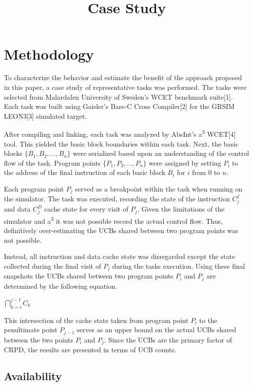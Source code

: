 \documentclass[12pt]{article}
\title{Case Study}
\begin{document}
\section{Methodology}

To characterize the behavior and estimate the benefit of the approach
proposed in this paper, a case study of representative tasks was
performed. The tasks were selected from Malardalen University of
Sweden's WCET benchmark suite[1]. Each task was built using Gaisler's
Bare-C Cross Compiler[2] for the GRSIM LEON3[3] simulated target. 

After compiling and linking, each task was analyzed by AbsInt's
a\textsuperscript{3} WCET[4] tool. This yielded the basic block
boundaries within each task. Next, the basic blocks
${\{B_1, B_2, ..., B_n\}}$ were serialized based upon an understanding of
the control flow of the task. Program points
${\{P_1, P_2, ..., P_n\}}$ were assigned by setting ${P_i}$ to the
address of the final instruction of each basic block ${B_i}$ for ${i}$
from ${0}$ to ${n}$.

Each program point ${P_j}$ served as a breakpoint within the task when
running on the simulator. The task was executed, recording the state of
the instruction ${C^I_j}$ and data ${C^D_j}$ cache state for every
visit of ${P_j}$. Given the limitations of the simulator and
a\textsuperscript{3} it was not possible record the actual control
flow. Thus, definitively over-estimating the UCBs shared between two
program points was not possible.

Instead, all instruction and data cache state was disregarded except
the state collected during the final visit of ${P_j}$ during the tasks
execution. Using these final snapshots the UCBs shared between two
program points ${P_i}$ and ${P_j}$ are determined by the following
equation.

\begin{center}
  ${\bigcap_{k=i}^{j-1} C_k}$
\end{center}

This intersection of the cache state taken from program point ${P_i}$
to the penultimate point ${P_{j-1}}$ serves as an upper bound on the
actual UCBs shared between the two points ${P_i}$ and ${P_j}$. Since
the UCBs are the primary factor of CRPD, the results are presented in
terms of UCB counts.

\subsection{Availability}
\end{document}
